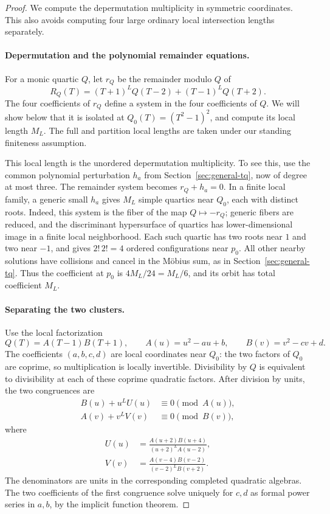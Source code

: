 \documentclass[11pt]{article}
\theoremstyle{definition}
\begin{document}
\begin{proof}
We compute the depermutation multiplicity in symmetric coordinates.
This also avoids computing four large ordinary local intersection
lengths separately.

\paragraph{Depermutation and the polynomial remainder equations.}
For a monic quartic $Q$, let $r_Q$ be the remainder modulo $Q$ of
\[
 R_Q(T)=(T+1)^LQ(T-2)+(T-1)^LQ(T+2).
\]
The four coefficients of $r_Q$ define a system in the four coefficients
of $Q$. We will show below that it is isolated at
$Q_0(T)=(T^2-1)^2$, and compute its local length $M_L$. The full and partition local lengths are taken under our standing
finiteness assumption.

This local length is the unordered depermutation multiplicity. To see
this, use the common polynomial perturbation $h_a$ from
Section~\ref{sec:general-tq}, now of degree at most three.
The remainder system becomes $r_Q+h_a=0$. In a finite local family, a
generic small $h_a$ gives $M_L$ simple quartics near $Q_0$, each with
distinct roots. Indeed, this system is the fiber of the map
$Q\mapsto-r_Q$; generic fibers are reduced, and the discriminant
hypersurface of quartics has lower-dimensional image in a finite local
neighborhood. Each such quartic has two roots near $1$ and two near
$-1$, and gives $2!\,2!=4$ ordered configurations near $p_0$.
All other nearby solutions have collisions and cancel in the M\"obius
sum, as in Section~\ref{sec:general-tq}.
Thus the coefficient at $p_0$ is $4M_L/24=M_L/6$, and its orbit has
total coefficient $M_L$.

\paragraph{Separating the two clusters.}
Use the local factorization
\[
 Q(T)=A(T-1)B(T+1),\qquad
 A(u)=u^2-au+b,\qquad B(v)=v^2-cv+d.
\]
The coefficients $(a,b,c,d)$ are local coordinates near $Q_0$: the two
factors of $Q_0$ are coprime, so multiplication is locally invertible.
Divisibility by $Q$ is equivalent to divisibility at each of these
coprime quadratic factors. After division by units, the two congruences
are
\begin{equation}\label{eq:n4-cluster-congruences}
 \begin{aligned}
 B(u)+u^LU(u)&\equiv0\pmod{A(u)},\\
 A(v)+v^LV(v)&\equiv0\pmod{B(v)},
 \end{aligned}
\end{equation}
where
\[
 \begin{aligned}
 U(u)&=\frac{A(u+2)B(u+4)}{(u+2)^LA(u-2)},\\
 V(v)&=\frac{A(v-4)B(v-2)}{(v-2)^LB(v+2)}.
 \end{aligned}
\]
The denominators are units in the corresponding completed quadratic
algebras. The two coefficients of the first congruence solve uniquely
for $c,d$ as formal power series in $a,b$, by the implicit function
theorem.


\end{proof}
\end{document}
